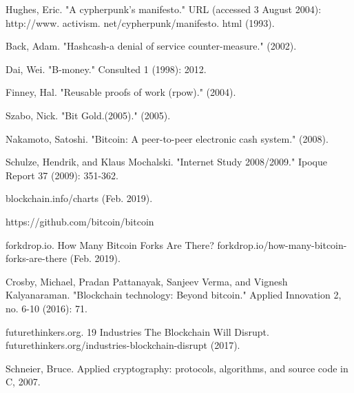 \documentclass[conference,compsoc]{IEEEtran}
\begin{document}

%
%
%
\newpage
\begin{thebibliography}{1}

Hughes, Eric. "A cypherpunk’s manifesto." URL (accessed 3 August 2004): http://www. activism. net/cypherpunk/manifesto. html (1993).

Back, Adam. "Hashcash-a denial of service counter-measure." (2002).

Dai, Wei. "B-money." Consulted 1 (1998): 2012.

Finney, Hal. "Reusable proofs of work (rpow)." (2004).

Szabo, Nick. "Bit Gold.(2005)." (2005).

Nakamoto, Satoshi. "Bitcoin: A peer-to-peer electronic cash system." (2008).

Schulze, Hendrik, and Klaus Mochalski. "Internet Study 2008/2009." Ipoque Report 37 (2009): 351-362.

blockchain.info/charts (Feb. 2019).

https://github.com/bitcoin/bitcoin

forkdrop.io. How Many Bitcoin Forks Are There? forkdrop.io/how-many-bitcoin-forks-are-there (Feb. 2019).

Crosby, Michael, Pradan Pattanayak, Sanjeev Verma, and Vignesh Kalyanaraman. "Blockchain technology: Beyond bitcoin." Applied Innovation 2, no. 6-10 (2016): 71.

futurethinkers.org. 19 Industries The Blockchain Will Disrupt. futurethinkers.org/industries-blockchain-disrupt (2017).

Schneier, Bruce. Applied cryptography: protocols, algorithms, and source code in C, 2007.

\end{thebibliography}




\end{document}
